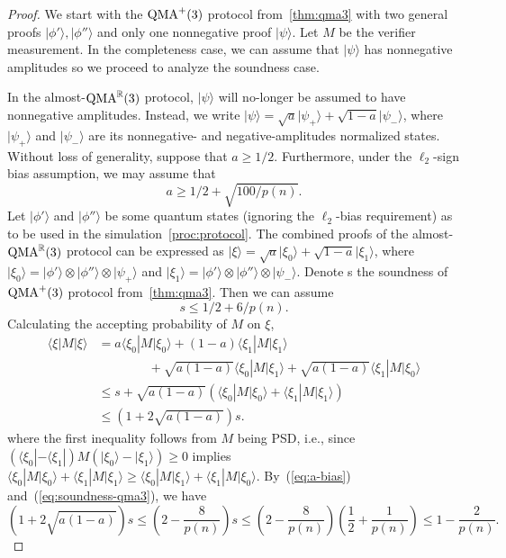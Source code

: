 \documentclass[10pt,a4paper]{article}
\theoremstyle{remark}
\newcommand{\ie}{i.e.,\xspace}
\newcommand{\R}{{\mathbb R}}
\newcommand{\1}[1]{\mathds{1}{[#1]}}
\newcommand{\ket}[1]{\lvert #1\rangle}
\newcommand{\QMA}{\textup{QMA}}
\newcommand{\bra}[1]{\langle#1|}
\numberwithin{equation}{section}
\begin{document}
\begin{proof}
  We start with the $\QMA^+(3)$ protocol from~\cref{thm:qma3} with two general proofs $\ket{\phi'},\ket{\phi''}$
  and only one nonnegative proof $\ket{\psi}$. Let $M$ be the verifier measurement.
  In the completeness case, we can assume that $\ket{\psi}$ has nonnegative amplitudes so we proceed
  to analyze the soundness case.

  In the \textup{almost}-$\QMA^\R(3)$ protocol, $\ket{\psi}$ will no-longer be assumed to have nonnegative
  amplitudes. Instead, we write  $\ket{\psi} = \sqrt{a} \ket{\psi_+} + \sqrt{1-a} \ket{\psi_{-}}$,
  where $\ket{\psi_+}$ and $\ket{\psi_{-}}$ are its nonnegative- and negative-amplitudes normalized states.
  Without loss of generality, suppose that $a \ge 1/2$.
  Furthermore, under the $\ell_2$-sign bias assumption, we may assume that 
  \begin{equation}\label{eq:a-bias}
      a \ge 1/2 + \sqrt{100/p(n)}.
  \end{equation}
  Let $\ket{\phi'}$ and $\ket{\phi''}$ be some quantum states (ignoring the $\ell_2$-bias requirement) as to be used in the simulation~\cref{proc:protocol}.
  The combined proofs of the \textup{almost}-$\QMA^\R(3)$ protocol can be expressed as $\ket{\xi} = \sqrt{a} \ket{\xi_0} + \sqrt{1-a} \ket{\xi_1}$, where
  $\ket{\xi_0} = \ket{\phi'} \otimes \ket{\phi''} \otimes \ket{\psi_+}$ and $\ket{\xi_1} = \ket{\phi'} \otimes \ket{\phi''} \otimes \ket{\psi_{-}}$. 
  Denote s the soundness of $\QMA^+(3)$ protocol from~\cref{thm:qma3}. Then we can assume 
  \begin{equation}\label{eq:soundness-qma3}
  s \le 1/2 + 6/p(n).
  \end{equation}
  Calculating the accepting probability of $M$ on $\xi$,
  \begin{align}
    \bra{\xi} M \ket{\xi} 
        &= a \bra{\xi_0} M \ket{\xi_0} + (1-a) \bra{\xi_1} M \ket{\xi_1} \nonumber \\
        &\qquad\qquad +\sqrt{a(1-a)} \bra{\xi_0} M \ket{\xi_1} + 
        \sqrt{a(1-a)} \bra{\xi_1} M \ket{\xi_0}
        \nonumber \\
        &\le s + \sqrt{a(1-a)} \left(\bra{\xi_0} M \ket{\xi_0} + \bra{\xi_1} M \ket{\xi_1}\right) 
        \nonumber\\
        &\le (1+ 2\sqrt{a(1-a)})s. \label{eq:soundness-almost-qma}
  \end{align}
  where the first inequality follows from $M$ being PSD, \ie since $(\bra{\xi_0}-\bra{\xi_1}) M (\ket{\xi_0}-\ket{\xi_1}) \ge 0$
  implies $\bra{\xi_0} M \ket{\xi_0} + \bra{\xi_1} M \ket{\xi_1} \ge \bra{\xi_0} M \ket{\xi_1} + \bra{\xi_1} M \ket{\xi_0}$.
  By~(\ref{eq:a-bias}) and~(\ref{eq:soundness-qma3}), we have
    \[ 
  (1+ 2\sqrt{a(1-a)})s \le \left(2- \frac{8}{p(n)}\right) s \le\left(2- \frac{8}{p(n)}\right) \left(\frac{1}{2} + \frac{1}{p(n)}\right) \le 1 - \frac{2}{p(n)}.
    \] 
    


\end{proof}
\end{document}
